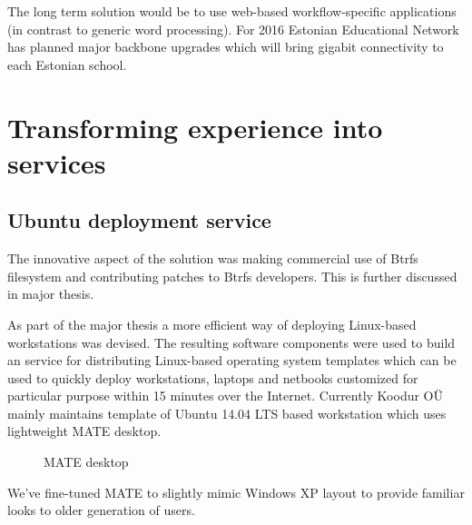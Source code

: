 \documentclass{article}
\begin{document}
The long term solution would be to use web-based
workflow-specific applications (in contrast
to generic word processing).
For 2016 Estonian Educational Network has planned major
backbone upgrades which will bring gigabit connectivity to each
Estonian school.


\section{Transforming experience into services}

\subsection{Ubuntu deployment service}

The innovative aspect of the solution was making
commercial use of Btrfs filesystem and contributing patches
to Btrfs developers.
This is further discussed in major thesis.

As part of the major thesis a more efficient way of deploying Linux-based
workstations was devised.
The resulting software components were used to build an service for
distributing Linux-based operating system templates which can be used to
quickly deploy workstations, laptops and netbooks customized
for particular purpose within 15 minutes over the Internet.
Currently Koodur OÜ mainly maintains template of Ubuntu 14.04 LTS based
workstation which uses lightweight MATE desktop.

\begin{figure}[!htb]
\centering
{}
\caption{MATE desktop}
\label{fig:digraph}
\end{figure}

We've fine-tuned MATE to slightly mimic Windows XP layout to provide
familiar looks to older generation of users.
\end{document}
